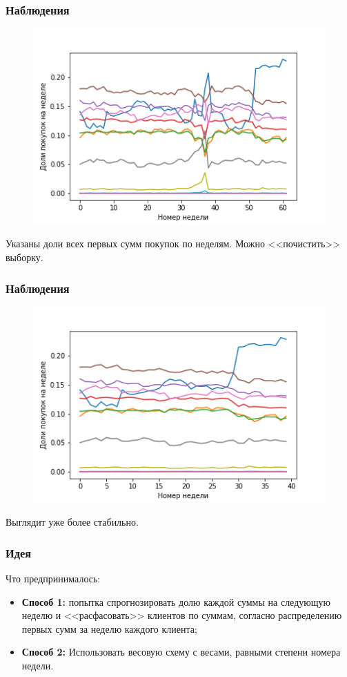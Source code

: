 \documentclass[serif,utf8]{beamer}
\begin{document}
\begin{frame}
\frametitle{Наблюдения}
\begin{figure}[h!]
   \centering
   \includegraphics[width=0.7\linewidth]{PartsBad.png}
\end{figure}
Указаны доли всех первых сумм покупок по неделям. Можно <<почистить>> выборку.
\end{frame}

\begin{frame}
\frametitle{Наблюдения}
\begin{figure}[h!]
   \centering
   \includegraphics[width=0.7\linewidth]{PartsGood.png}
\end{figure}
Выглядит уже более стабильно.
\end{frame}

\begin{frame}
\frametitle{Идея}
Что предпринималось:
\begin{itemize}
\item \textbf{Способ 1:} попытка спрогнозировать долю каждой суммы на следующую неделю и <<расфасовать>> клиентов по суммам, согласно распределению первых сумм за неделю каждого клиента;
\item \textbf{Способ 2:} Использовать весовую схему с весами, равными степени номера недели.
\end{itemize}
\end{frame}
\end{document}
